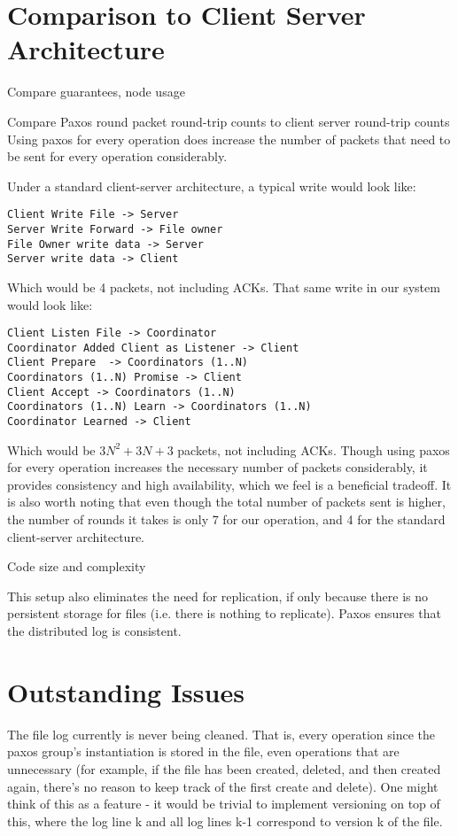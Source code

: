 \documentclass[11pt]{article}
\begin{document}
\section{Comparison to Client Server Architecture}

Compare guarantees, node usage

Compare Paxos round packet round-trip counts to client server round-trip counts
Using paxos for every operation does increase the number of packets that need to be sent for every operation considerably.

Under a standard client-server architecture, a typical write would look like:
\begin{verbatim}
Client Write File -> Server
Server Write Forward -> File owner
File Owner write data -> Server
Server write data -> Client
\end{verbatim}

Which would be 4 packets, not including ACKs. That same write in our system would look like:
\begin{verbatim}
Client Listen File -> Coordinator
Coordinator Added Client as Listener -> Client
Client Prepare  -> Coordinators (1..N)
Coordinators (1..N) Promise -> Client
Client Accept -> Coordinators (1..N)
Coordinators (1..N) Learn -> Coordinators (1..N)
Coordinator Learned -> Client
\end{verbatim}

Which would be $3N^2 + 3N + 3$ packets, not including ACKs. Though using paxos for every operation increases the necessary number of packets considerably, it provides consistency and high availability, which we feel is a beneficial tradeoff. It is also worth noting that even though the total number of packets sent is higher, the number of rounds it takes is only 7 for our operation, and 4 for the standard client-server architecture. 


Code size and complexity

This setup also eliminates the need for replication, if only because there is no persistent storage for files (i.e. there is nothing to replicate). Paxos ensures that the distributed log is consistent.

\section{Outstanding Issues}
The file log currently is never being cleaned. That is, every operation since the paxos group's instantiation is stored in the file, even operations that are unnecessary (for example, if the file has been created, deleted, and then created again, there's no reason to keep track of the first create and delete). One might think of this as a feature - it would be trivial to implement versioning on top of this, where the log line k and all log lines k-1 correspond to version k of the file. 
\end{document}
